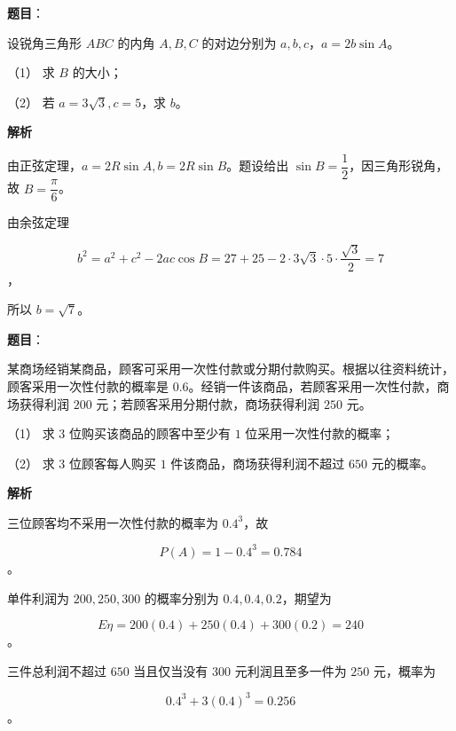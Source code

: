 \begin{answer}

\textbf{题目}：

设锐角三角形 $ABC$ 的内角 $A,B,C$ 的对边分别为 $a,b,c$，$a=2b\sin A$。

（1） 求 $B$ 的大小；

（2） 若 $a=3\sqrt3,c=5$，求 $b$。

\textbf{解析}


由正弦定理，$a=2R\sin A,b=2R\sin B$。题设给出 $\sin B=\dfrac12$，因三角形锐角，故 $B=\dfrac\pi6$。


由余弦定理

\nopagebreak[4]
\[
b^2=a^2+c^2-2ac\cos B
=27+25-2\cdot3\sqrt3\cdot5\cdot\frac{\sqrt3}{2}=7
\]
，

所以 $b=\sqrt7$。



\end{answer}
\begin{answer}

\textbf{题目}：

某商场经销某商品，顾客可采用一次性付款或分期付款购买。根据以往资料统计，顾客采用一次性付款的概率是 $0.6$。经销一件该商品，若顾客采用一次性付款，商场获得利润 $200$ 元；若顾客采用分期付款，商场获得利润 $250$ 元。

（1） 求 $3$ 位购买该商品的顾客中至少有 $1$ 位采用一次性付款的概率；

（2） 求 $3$ 位顾客每人购买 $1$ 件该商品，商场获得利润不超过 $650$ 元的概率。

\textbf{解析}


三位顾客均不采用一次性付款的概率为 $0.4^3$，故

\nopagebreak[4]
\[
P(A)=1-0.4^3=0.784
\]
。


单件利润为 $200,250,300$ 的概率分别为 $0.4,0.4,0.2$，期望为

\nopagebreak[4]
\[
E\eta=200(0.4)+250(0.4)+300(0.2)=240
\]
。

三件总利润不超过 $650$ 当且仅当没有 $300$ 元利润且至多一件为 $250$ 元，概率为

\nopagebreak[4]
\[
0.4^3+3(0.4)^3=0.256
\]
。



\end{answer}
